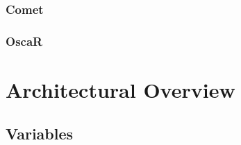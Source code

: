 \documentclass[a4paper,11pt]{article}
\begin{document}
    \subsubsection{Comet}
    \subsubsection{OscaR}
    
  

    
 
%  
\newpage
\section{Architectural Overview}  
  
  \subsection{Variables}
\end{document}
